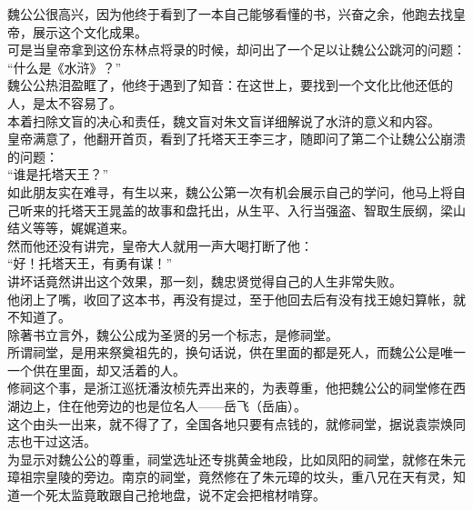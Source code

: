 \begin{multicols}{\theparacolNo}
魏公公很高兴，因为他终于看到了一本自己能够看懂的书，兴奋之余，他跑去找皇帝，展示这个文化成果。\\

可是当皇帝拿到这份东林点将录的时候，却问出了一个足以让魏公公跳河的问题：\\

“什么是《水浒》？”\\

魏公公热泪盈眶了，他终于遇到了知音：在这世上，要找到一个文化比他还低的人，是太不容易了。\\

本着扫除文盲的决心和责任，魏文盲对朱文盲详细解说了水浒的意义和内容。\\

皇帝满意了，他翻开首页，看到了托塔天王李三才，随即问了第二个让魏公公崩溃的问题：\\

“谁是托塔天王？”\\

如此朋友实在难寻，有生以来，魏公公第一次有机会展示自己的学问，他马上将自己听来的托塔天王晁盖的故事和盘托出，从生平、入行当强盗、智取生辰纲，梁山结义等等，娓娓道来。\\

然而他还没有讲完，皇帝大人就用一声大喝打断了他：\\

“好！托塔天王，有勇有谋！”\\

讲坏话竟然讲出这个效果，那一刻，魏忠贤觉得自己的人生非常失败。\\

他闭上了嘴，收回了这本书，再没有提过，至于他回去后有没有找王媳妇算帐，就不知道了。\\

除著书立言外，魏公公成为圣贤的另一个标志，是修祠堂。\\

所谓祠堂，是用来祭奠祖先的，换句话说，供在里面的都是死人，而魏公公是唯一一个供在里面，却又活着的人。\\

修祠这个事，是浙江巡抚潘汝桢先弄出来的，为表尊重，他把魏公公的祠堂修在西湖边上，住在他旁边的也是位名人——岳飞（岳庙）。\\

这个由头一出来，就不得了了，全国各地只要有点钱的，就修祠堂，据说袁崇焕同志也干过这活。\\

为显示对魏公公的尊重，祠堂选址还专挑黄金地段，比如凤阳的祠堂，就修在朱元璋祖宗皇陵的旁边。南京的祠堂，竟然修在了朱元璋的坟头，重八兄在天有灵，知道一个死太监竟敢跟自己抢地盘，说不定会把棺材啃穿。\\


\end{multicols}
